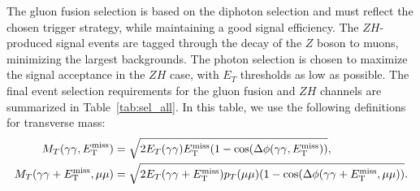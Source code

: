 The gluon fusion selection is based on the diphoton selection and must reflect the chosen trigger strategy, while maintaining a good signal efficiency. 
%
%
%
The $ZH$-produced signal events are tagged through the decay of the $Z$ boson to muons, minimizing the largest backgrounds. 
The photon selection is chosen to maximize the signal acceptance in the $ZH$ case, with $E_{T}$ thresholds as low as possible. 
%
The final event selection requirements for the gluon fusion  and $ZH$ channels are summarized in Table~\ref{tab:sel_all}. In this table, we use the following definitions for transverse mass:
\begin{align}
M_{T}(\gamma\gamma,E_{\mathrm{T}}^{\text{miss}}) &= \sqrt{2E_{T}(\gamma\gamma)E_{\mathrm{T}}^{\text{miss}}(1-\cos(\Delta\phi(\gamma\gamma,E_{\mathrm{T}}^{\text{miss}}))}, \\
M_{T}(\gamma\gamma+E_{\mathrm{T}}^{\text{miss}}, \mu\mu) &= \sqrt{2E_{T}(\gamma\gamma+E_{\mathrm{T}}^{\text{miss}})p_{T}(\mu\mu)(1-\cos(\Delta\phi(\gamma\gamma+E_{\mathrm{T}}^{\text{miss}},\mu\mu))}.
\end{align}

